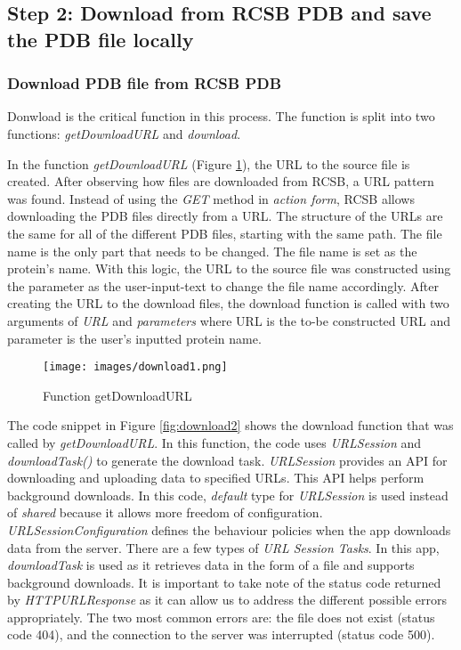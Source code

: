 \subsection{Step 2: Download from RCSB PDB and save the PDB file locally}
\subsubsection{Download PDB file from RCSB PDB}
Donwload is the critical function in this process. The function is split into two functions: \emph{getDownloadURL} and \emph{download}.

In the function \emph{getDownloadURL} (Figure \ref{fig:download1}), the URL to the source file is created. After observing how files are downloaded from RCSB, a URL pattern was found. Instead of using the \emph{GET} method in \emph{action form}, RCSB allows downloading the PDB files directly from a URL. The structure of the URLs are the same for all of the different PDB files, starting with the same path. The file name is the only part that needs to be changed. The file name is set as the protein's name. With this logic, the URL to the source file was constructed using the parameter as the user-input-text to change the file name accordingly. After creating the URL to the download files, the download function is called with two arguments of \emph{URL} and \emph{parameters} where URL is the to-be constructed URL and parameter is the user's inputted protein name.
 \begin{figure}[!htp]
	\centering
	\texttt{[image: images/download1.png]}
	\caption{Function getDownloadURL}
	\label{fig:download1}
\end{figure}

The code snippet in Figure \ref{fig:download2} shows the download function that was called by \emph{getDownloadURL}. In this function, the code uses \emph{URLSession} and \emph{downloadTask()} to generate the download task. \emph{URLSession} provides an API for downloading and uploading data to specified URLs. This API helps perform background downloads. In this code, \emph{default} type for \emph{URLSession} is used instead of \emph{shared} because it allows more freedom of configuration. \emph{URLSessionConfiguration} defines the behaviour policies when the app downloads data from the server. There are a few types of \emph{URL Session Tasks}. In this app, \emph{downloadTask} is used as it retrieves data in the form of a file and supports background downloads. 
It is important to take note of the status code returned by \emph{HTTPURLResponse} as it can allow us to address the different possible errors appropriately. The two most common errors are: the file does not exist (status code 404), and the connection to the server was interrupted (status code 500). 

